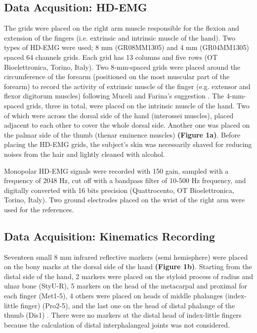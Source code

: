 \documentclass[conference]{IEEEtran}
\begin{document}
\subsection{Data Acqusition: HD-EMG}
The grids were placed on the right arm muscle responsible for the flexion and extension of the fingers (i.e. extrinsic and intrinsic muscle of the hand). Two types of HD-EMG were used; 8 mm (GR08MM1305) and 4 mm (GR04MM1305) spaced 64 channels grids. Each grid has 13 columns and five rows (OT Bioelettronica, Torino, Italy). Two 8-mm-spaced grids were placed around the circumference of the forearm (positioned on the most muscular part of the forearm) to record the activity of extrinsic muscle of the finger (e.g. extensor and flexor digitorum muscles) following Muceli and Farina's suggestion \cite{b9}. The 4-mm-spaced grids, three in total, were placed on the intrinsic muscle of the hand. Two of which were across the dorsal side of the hand (interossei muscles), placed adjacent to each other to cover the whole dorsal side. Another one was placed on the palmar side of the thumb (thenar eminence muscles) \textbf{(Figure 1a)}. Before placing the HD-EMG grids, the subject’s skin was necessarily shaved for reducing noises from the hair and lightly cleaned 
with alcohol.

Monopolar HD-EMG signals were recorded with 150 gain, sampled with a frequency of 2048 Hz, cut off with a bandpass filter of 10-500 Hz frequency, and digitally converted with 16 bits precision 
(Quattrocento, OT Bioelettronica, Torino, Italy). Two ground electrodes placed on the wrist of the right arm were used for the references.

\subsection{Data Acquisition: Kinematics Recording}
Seventeen small 8 mm infrared reflective markers (semi hemisphere) were placed on the bony marks 
at the dorsal side of the hand \textbf{(Figure 1b)}. Starting from the distal side of the hand, 2 markers were placed on 
the styloid process of radius and ulnar bone (StyU-R), 5 markers on the head of the metacarpal and proximal 
for each finger (Met1-5), 4 others were placed on heads of middle phalanges (index-little finger) (Pro2-5), 
and the last one on the head of distal phalange of the thumb (Dis1) \cite{b25}. There were no markers at the distal 
head of index-little fingers because the calculation of distal interphalangeal joints was not considered.
\end{document}
